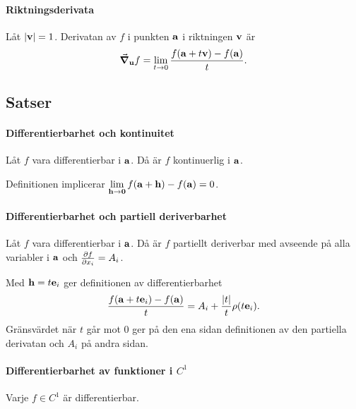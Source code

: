 \paragraph{Riktningsderivata}
Låt $\abs{\vect{v}} = 1$. Derivatan av $f$ i punkten $\vect{a}$ i riktningen $\vect{v}$ är
\begin{align*}
	\grad_{\vect{u}}f = \limit{t}{0}\frac{f(\vect{a} + t\vect{v}) - f(\vect{a})}{t}.
\end{align*}

\subsection{Satser}

\paragraph{Differentierbarhet och kontinuitet}
Låt $f$ vara differentierbar i $\vect{a}$. Då är $f$ kontinuerlig i $\vect{a}$.

\proof
Definitionen implicerar $\limit{\vect{h}}{\vect{0}}f(\vect{a} + \vect{h}) - f(\vect{a}) = 0$.

\paragraph{Differentierbarhet och partiell deriverbarhet}
Låt $f$ vara differentierbar i $\vect{a}$. Då är $f$ partiellt deriverbar med avseende på alla variabler i $\vect{a}$ och $\pdv{f}{x_i}(\vect{a}) = A_i$.

\proof
Med $\vect{h} = t\vect{e}_i$ ger definitionen av differentierbarhet
\begin{align*}
	\frac{f(\vect{a} + t\vect{e}_i) - f(\vect{a})}{t} = A_i + \frac{\abs{t}}{t}\rho(t\vect{e}_i).
\end{align*}
Gränsvärdet när $t$ går mot $0$ ger på den ena sidan definitionen av den partiella derivatan och $A_i$ på andra sidan.

\paragraph{Differentierbarhet av funktioner i $C^1$}
Varje $f\in C^1$ är differentierbar.

